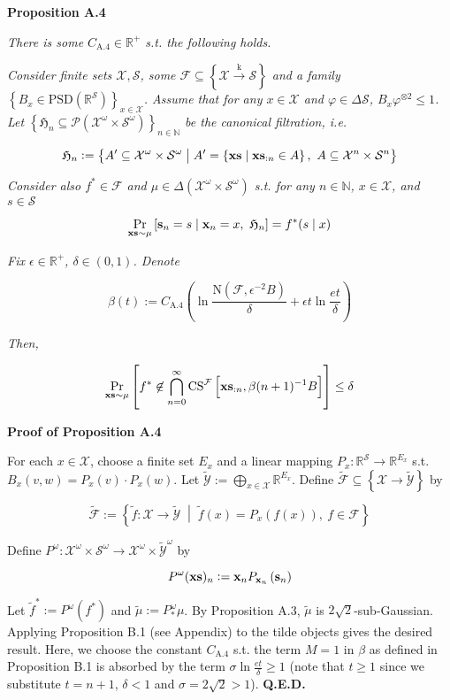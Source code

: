 \documentclass[a4paper]{article}
\newcommand{\Co}[1]{}
\newcommand{\AP}[1]{\left(#1\right)}
\newcommand{\AB}[1]{\left[#1\right]}
\newcommand{\AC}[1]{\left\{#1\right\}}
\newcommand{\ABM}[2]{\left[#1\;\middle\vert\;#2\right]}
\newcommand{\ACM}[2]{\left\{#1\;\middle\vert\;#2\right\}}
\newcommand{\Pa}[2]{\underset{#1}{\operatorname{Pr}}\AB{#2}}
\newcommand{\CP}[3]{\underset{#1}{\operatorname{Pr}}\ABM{#2}{#3}}
\newcommand{\PS}[1]{\mathcal{P}\AP{#1}}
\newcommand{\Nats}{\mathbb{N}}
\newcommand{\Reals}{\mathbb{R}}
\newcommand{\PSD}{\mathrm{PSD}}
\newcommand{\K}{\xrightarrow{\mathrm{k}}}
\newcommand{\B}{B}
\newcommand{\X}{\mathcal{X}}
\newcommand{\Y}{\mathcal{Y}}
\newcommand{\F}{\mathcal{F}}
\newcommand{\St}{\mathcal{S}}
\newcommand{\N}{\mathrm{N}}
\newcommand{\CS}{\mathrm{CS}}
\begin{document}
\textbf{Proposition A.4}\Co{b}

\textit{There is some $C_{\mathrm{A.4}}\in\Reals^+$ s.t. the following holds.}\Co{i}

\textit{Consider finite sets $\X,\St$, some $\F\subseteq\AC{\X\K\St}$ and a family $\AC{\B _x\in\PSD\AP{\Reals^\St}}_{x\in\X}$. Assume that for any $x\in\X$ and $\varphi\in\Delta\St$, $B_x\varphi^{\otimes2}\leq1$. Let $\AC{\mathfrak{H}_n\subseteq\PS{\X^\omega\times\St^\omega}}_{n\in\Nats}$ be the canonical filtration, i.e.}\Co{i}

$$\mathfrak{H}_n:=\ACM{A'\subseteq\X^\omega\times\St^\omega}{A'=\ACM{\bold{xs}}{\bold{xs}_{:n}\in A},\ A\subseteq\X^n\times\St^n}$$

\textit{Consider also $f^*\in\F$ and $\mu\in\Delta\AP{\X^\omega\times\St^\omega}$ s.t. for any $n\in\Nats$, $x\in\X$, and $s\in\St$}\Co{i}

$$\CP{\bold{xs}\sim\mu}{\bold{s}_n=s}{\bold{x}_n=x,\ \mathfrak{H}_n} = f^*(s\mid x)$$

\textit{Fix $\epsilon\in\Reals^+$, $\delta\in(0,1)$. Denote}\Co{i}

$$\beta(t):=C_{\mathrm{A.4}}\AP{\ln{\frac{\N(\F,\epsilon^{-2}\B )}{\delta}}+\epsilon t\ln{\frac{et}{\delta}}}$$

\textit{Then,}\Co{i}

$$\Pa{\bold{xs}\sim\mu}{f^*\not\in\bigcap_{n=0}^\infty\CS^\F\AB{\bold{xs}_{:n},\beta(n+1)^{-1}\B}} \leq \delta$$

\textbf{Proof of Proposition A.4}\Co{b}

For each $x\in\X$, choose a finite set $E_x$ and a linear mapping $P_x:\Reals^\St\rightarrow\Reals^{E_x}$ s.t. $B_x\AP{v,w}=P_x(v)\cdot P_x(w)$. Let $\tilde{\Y}:=\bigoplus_{x\in\X}\Reals^{E_x}$. Define $\tilde{\F}\subseteq\AC{\X\rightarrow\tilde{\Y}}$ by

$$\tilde{\F}:=\ACM{\tilde{f}:\X\rightarrow\tilde{\Y}}{\tilde{f}(x)=P_x\AP{f(x)},\ f\in\F}$$

Define $P^\omega:\X^\omega\times\St^\omega\rightarrow\X^\omega\times\tilde{\Y}^\omega$ by

$$P^\omega(\bold{xs})_n:=\bold{x}_nP_{\bold{x}_n}\AP{\bold{s}_n}$$

Let $\tilde{f}^*:=P^\omega\AP{f^*}$ and $\tilde{\mu}:=P^\omega_*\mu$. By Proposition A.3, $\tilde{\mu}$ is $2\sqrt{2}$-sub-Gaussian. Applying Proposition B.1 (see Appendix) to the tilde objects gives the desired result. Here, we choose the constant $C_{\text{A.4}}$ s.t. the term $M=1$ in $\beta$ as defined in Proposition B.1 is absorbed by the term $\sigma\ln{\frac{et}{\delta}}\geq1$ (note that $t\geq1$ since we substitute $t=n+1$, $\delta<1$ and $\sigma=2\sqrt{2}>1$). \textbf{Q.E.D.}\Co{b}
\end{document}
